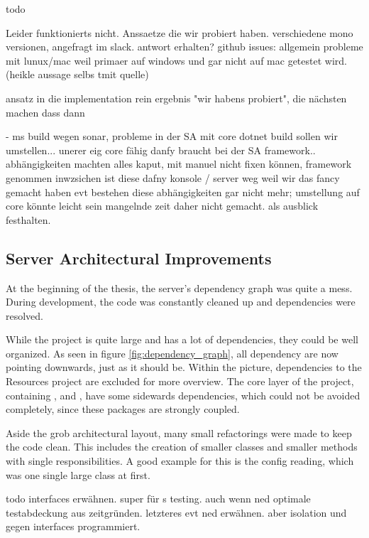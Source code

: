 todo

Leider funktionierts nicht.
Anssaetze die wir probiert haben. verschiedene mono versionen, angefragt im slack. antwort erhalten?
github issues: allgemein probleme mit lunux/mac weil primaer auf windows und gar nicht auf mac getestet wird. (heikle aussage selbs tmit quelle)

ansatz in die implementation rein
ergebnis "wir habens probiert", die nächsten machen dass dann

- ms build wegen sonar, probleme in der SA mit core
dotnet build sollen wir umstellen...
unerer eig core fähig
danfy braucht bei der SA framework.. abhängigkeiten machten alles kaput, mit manuel nicht fixen können, framework genommen
inwzsichen ist diese dafny konsole / server weg weil wir das fancy gemacht haben
evt bestehen diese abhängigkeiten gar nicht mehr; umstellung auf core könnte leicht sein
mangelnde zeit daher nicht gemacht. als ausblick festhalten.

\cite{sa}
\cite{mono-slack}
\cite{mono-git}


\subsection{Server Architectural Improvements}
At the beginning of the thesis, the server's dependency graph was quite a mess.
During development, the code was constantly cleaned up and dependencies were resolved.

While the project is quite large and has a lot of dependencies, they could be well organized.
As seen in figure \ref{fig:dependency_graph}, all dependency are now pointing downwards, just as it should be.
Within the picture, dependencies to the Resources project are excluded for more overview.
The core layer of the project, containing ,  and , have some sidewards dependencies, which could not be avoided completely, since these packages are strongly coupled.

Aside the grob architectural layout, many small refactorings were made to keep the code clean.
This includes the creation of smaller classes and smaller methods with single responsibilities.
A good example for this is the config reading, which was one single large class at first. 

todo interfaces erwähnen. super für s testing. auch wenn ned optimale testabdeckung aus zeitgründen. letzteres evt ned erwähnen.
aber isolation und gegen interfaces programmiert. 


